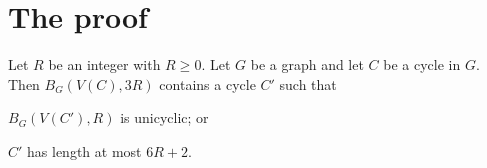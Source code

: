 \documentclass{patmorin}
\newcommand{\piotr}[1]{\textcolor{red}{Piotr: #1}}
\begin{document}
\begin{comment}
\piotr{Here is a version we had in mind all the time. It is a bit of a mouthfull. And it is obvious that \cref{thm:gyarfas-lehel-general} implies \cref{thm:gyarfas-lehel}.}

Let $p$ be a positive integer and let $F_i$ be a forest for each $i\in[p]$. 
A tuple $(A_1,\ldots,A_p)$ is a  \mathdefin{$(p,c)$-subtree} of $(F_1,\ldots,F_p)$ if 
\begin{compactenum}[\rm(i)]
\item $A_i\subseteq V(F_i)$ for each $i\in[p]$; and
\item $F_i[A_i]$ consists of at most $c$ components.
\end{compactenum}
We say that two $(p,c)$-subtrees $(A_1,\ldots,A_p)$, $(B_1,\ldots,B_p)$ are \mathdefin{independent} if 
$A_i\cap B_i=\emptyset$ for all $i\in[p]$.
We say that a set $\mathcal{I}$ of $(p,c)$-subtrees is \mathdefin{independent} if
 $I$ and $J$ are independent for every two distinct $I,J\in\mathcal{I}$.
\begin{thm}[\citet{gyarfas.lehel:helly}]\label{thm:gyarfas-lehel}
   There exists a function $\ell:\N\times\N\times\N\to\N$ such that the following is true. For every $p,k,c\in\N$ with $c\geq1$, for every $p$-tuple of forests $\mathcal{F}=(F_1,\ldots,F_p)$ and 
    every collection $\mathcal{A}$ of $(p,c)$-subtrees of $\mathcal{F}$, either
   \begin{compactenum}[(a)]
     \item there exists a subfamily $\mathcal{I}$ of $\mathcal{A}$ such that $\mathcal{I}$ is independent and $\mathcal{I}$ is of size $k$; or
     \item there exist $X_i \subseteq V(F_i)$ for each $i\in[p]$ such that $\Sigma_{i\in[p]} |X_i|\leq \ell(p,k,c)$ and 
     for each $(A_1,\ldots,A_p)\in\mathcal{A}$ there exists $i\in[p]$ with $X_i\cap A_i\neq\emptyset$.
   \end{compactenum}
\end{thm}
\end{proof}
\end{comment}
\section{The proof}

\begin{lem}\label{short_or_unicycle_nearby}
  Let $R$ be an integer with $R\ge 0$.
  Let $G$ be a graph and let $C$ be a cycle in $G$.
  Then $B_G(V(C),3R)$ contains a cycle $C'$ such that
  \begin{compactenum}[(a)]
    \item $B_G(V(C'),R)$ is unicyclic; or\label{short_or_unicycle_nearby:unicyclic}
    \item $C'$ has length at most $6R+2$.\label{short_or_unicycle_nearby:short}
  \end{compactenum}
\end{lem}
\end{document}
